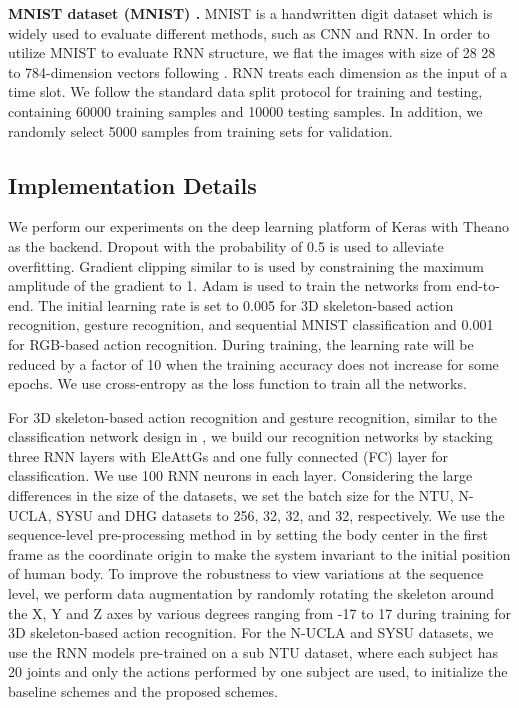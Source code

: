\documentclass[journal]{IEEEtran}
\newcommand{\EleAttGn}{{EleAttG}}
\begin{document}
\textbf{MNIST dataset (MNIST) \cite{lecun1998gradient}.} MNIST is a handwritten digit dataset which is widely used to evaluate different methods, such as CNN and RNN. In order to utilize MNIST to evaluate RNN structure, we flat the images with size of 28  28 to 784-dimension vectors following \cite{le2015simple,arjovsky2016unitary,cooijmans2016recurrent,campos2018skip,li2018independently}. RNN treats each dimension as the input of a time slot. We follow the standard data split protocol for training and testing, containing 60000 training samples and 10000 testing samples. In addition, we randomly select 5000 samples from training sets for validation.


\subsection{Implementation Details}
\label{subsec:implement}

We perform our experiments on the deep learning platform of Keras \cite{chollet2015keras} with Theano \cite{al2016theano} as the backend. Dropout \cite{srivastava2014dropout} with the probability of 0.5 is used to alleviate overfitting. Gradient clipping similar to \cite{sutskever2014sequence} is used by constraining the maximum amplitude of the gradient to 1. Adam \cite{kingma2014adam} is used to train the networks from end-to-end. The initial learning rate is set to 0.005 for 3D skeleton-based action recognition, gesture recognition, and sequential MNIST classification and 0.001 for RGB-based action recognition. During training, the learning rate will be reduced by a factor of 10 when the training accuracy does not increase for some epochs. We use cross-entropy as the loss function to train all the networks. 

For 3D skeleton-based action recognition and gesture recognition, similar to the classification network design in \cite{zhang2017view}, we build our recognition networks by stacking three RNN layers with {\EleAttGn}s and one fully connected (FC) layer for classification. We use 100 RNN neurons in each layer. Considering the large differences in the size of the datasets, we set the batch size for the NTU, N-UCLA, SYSU and DHG datasets to 256, 32, 32, and 32, respectively. We use the sequence-level pre-processing method in \cite{zhang2017view} by setting the body center in the first frame as the coordinate origin to make the system invariant to the initial position of human body. To improve the robustness to view variations at the sequence level, we perform data augmentation by randomly rotating the skeleton around the X, Y and Z axes by various degrees ranging from -17 to 17 during training for 3D skeleton-based action recognition. For the N-UCLA and SYSU datasets, we use the RNN models pre-trained on a sub NTU dataset, where each subject has 20 joints and only the actions performed by one subject are used, to initialize the baseline schemes and the proposed schemes.   
\end{document}
